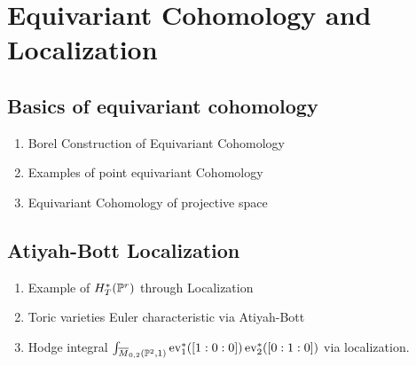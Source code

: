 \documentclass[12pt]{memoir}
\begin{document}
\chapter{Equivariant Cohomology and Localization}

\section{Basics of equivariant cohomology}
\begin{enumerate}
    \item Borel Construction of Equivariant Cohomology
    \item Examples of point equivariant Cohomology
    \item Equivariant Cohomology of projective space
\end{enumerate}

\section{Atiyah-Bott Localization}

\begin{enumerate}
    \item Example of $H^\ast_T(\mathbb{P}^r)$ through Localization
    \item Toric varieties Euler characteristic via Atiyah-Bott
    \item Hodge integral $\int_{\overline M_{0,2}(\mathbb{P}^2,1)}\operatorname{ev}_1^\ast([1:0:0])\operatorname{ev}_2^\ast([0:1:0])$ via localization.
\end{enumerate}

\ifx\nextra\undefined
\printindex
\else\fi
\nocite{*}


\end{document}
